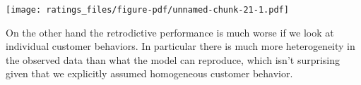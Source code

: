 \documentclass[
  letterpaper,
  DIV=11,
  numbers=noendperiod]{scrartcl}
\newenvironment{Shaded}{\begin{snugshade}}{\end{snugshade}}
\newcommand{\AttributeTok}[1]{\textcolor[rgb]{0.40,0.45,0.13}{#1}}
\newcommand{\DecValTok}[1]{\textcolor[rgb]{0.68,0.00,0.00}{#1}}
\newcommand{\FloatTok}[1]{\textcolor[rgb]{0.68,0.00,0.00}{#1}}
\newcommand{\FunctionTok}[1]{\textcolor[rgb]{0.28,0.35,0.67}{#1}}
\newcommand{\NormalTok}[1]{\textcolor[rgb]{0.00,0.23,0.31}{#1}}
\newcommand{\SpecialCharTok}[1]{\textcolor[rgb]{0.37,0.37,0.37}{#1}}
\newcommand{\StringTok}[1]{\textcolor[rgb]{0.13,0.47,0.30}{#1}}
\begin{document}
\begin{Shaded}
\end{Shaded}

\texttt{[image: ratings\_files/figure-pdf/unnamed-chunk-21-1.pdf]}

On the other hand the retrodictive performance is much worse if we look
at individual customer behaviors. In particular there is much more
heterogeneity in the observed data than what the model can reproduce,
which isn't surprising given that we explicitly assumed homogeneous
customer behavior.
\end{document}
